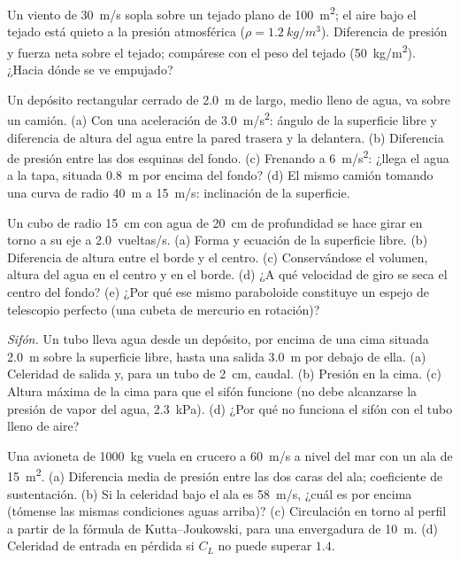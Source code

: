 \begin{exercise}[$\star$]\label{exo:b2:euler-bernoulli:4}
Un viento de \qty{30}{m/s} sopla sobre un tejado plano de \qty{100}{m^2};
el aire bajo el tejado está quieto a la presión atmosférica
($\rho = \qty{1.2}{kg/m^3}$). Diferencia de presión y fuerza neta sobre el
tejado; compárese con el peso del tejado (\qty{50}{kg/m^2}). ¿Hacia dónde se ve empujado?
\end{exercise}

\begin{exercise}[$\star\star$]\label{exo:b2:euler-bernoulli:5}
Un depósito rectangular cerrado de \qty{2.0}{m} de largo, medio lleno de
agua, va sobre un camión. (a) Con una aceleración de \qty{3.0}{m/s^2}:
ángulo de la superficie libre y diferencia de altura del agua entre la
pared trasera y la delantera. (b) Diferencia de presión entre las dos
esquinas del fondo. (c) Frenando a \qty{6}{m/s^2}: ¿llega el agua a la
tapa, situada \qty{0.8}{m} por encima del fondo? (d) El mismo camión
tomando una curva de radio \qty{40}{m} a \qty{15}{m/s}: inclinación de la superficie.
\end{exercise}

\begin{exercise}[$\star\star$]\label{exo:b2:euler-bernoulli:6}
Un cubo de radio \qty{15}{cm} con agua de \qty{20}{cm} de profundidad se
hace girar en torno a su eje a \qty{2.0}{vueltas/s}. (a) Forma y ecuación
de la superficie libre. (b) Diferencia de altura entre el borde y el
centro. (c) Conservándose el volumen, altura del agua en el centro y en el
borde. (d) ¿A qué velocidad de giro se seca el centro del fondo? (e) ¿Por
qué ese mismo paraboloide constituye un espejo de telescopio perfecto (una
cubeta de mercurio en rotación)?
\end{exercise}

\begin{exercise}[$\star\star$]\label{exo:b2:euler-bernoulli:7}
\emph{Sifón.} Un tubo lleva agua desde un depósito, por encima de una cima
situada \qty{2.0}{m} sobre la superficie libre, hasta una salida
\qty{3.0}{m} por debajo de ella. (a) Celeridad de salida y, para un tubo de
\qty{2}{cm}, caudal. (b) Presión en la cima. (c) Altura máxima de la cima
para que el sifón funcione (no debe alcanzarse la presión de vapor del
agua, \qty{2.3}{kPa}). (d) ¿Por qué no funciona el sifón con el tubo lleno de aire?
\end{exercise}

\begin{exercise}[$\star\star$]\label{exo:b2:euler-bernoulli:8}
Una avioneta de \qty{1000}{kg} vuela en crucero a \qty{60}{m/s} a nivel del
mar con un ala de \qty{15}{m^2}. (a) Diferencia media de presión entre las
dos caras del ala; coeficiente de sustentación. (b) Si la celeridad bajo
el ala es \qty{58}{m/s}, ¿cuál es por encima (tómense las mismas
condiciones aguas arriba)? (c) Circulación en torno al perfil a partir de
la fórmula de Kutta--Joukowski, para una envergadura de \qty{10}{m}.
(d) Celeridad de entrada en pérdida si $C_L$ no puede superar $1.4$.
\end{exercise}


